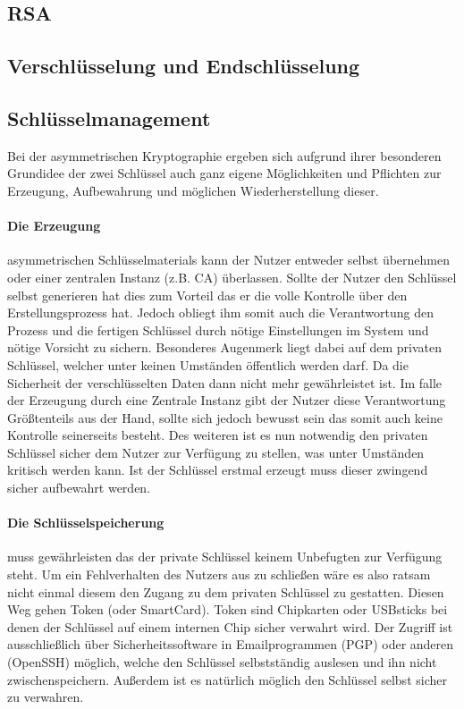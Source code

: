 \documentclass[paper=a4,11pt,german]{scrartcl} %
\begin{document}
\subsection{RSA}

\subsection{Verschlüsselung und Endschlüsselung}

\subsection{Schlüsselmanagement}
Bei der asymmetrischen Kryptographie ergeben sich aufgrund ihrer besonderen Grundidee der zwei Schlüssel auch ganz eigene Möglichkeiten und Pflichten zur Erzeugung, Aufbewahrung und möglichen Wiederherstellung dieser. 

\paragraph{Die Erzeugung}
asymmetrischen Schlüsselmaterials kann der Nutzer entweder selbst übernehmen oder einer zentralen Instanz (z.B. CA) überlassen.
Sollte der Nutzer den Schlüssel selbst generieren hat dies zum Vorteil das er die volle Kontrolle über den Erstellungsprozess hat. Jedoch obliegt ihm somit auch die Verantwortung den Prozess und die fertigen Schlüssel durch nötige Einstellungen im System und nötige Vorsicht zu sichern. Besonderes Augenmerk liegt dabei auf dem privaten Schlüssel, welcher unter keinen Umständen öffentlich werden darf. Da die Sicherheit der verschlüsselten Daten dann nicht mehr gewährleistet ist. 
Im falle der Erzeugung durch eine Zentrale Instanz gibt der Nutzer diese Verantwortung Größtenteils aus der Hand, sollte sich jedoch bewusst sein das somit auch keine Kontrolle seinerseits besteht. Des weiteren ist es nun notwendig den privaten Schlüssel sicher dem Nutzer zur Verfügung zu stellen, was unter Umständen kritisch werden kann. Ist der Schlüssel erstmal erzeugt muss dieser zwingend sicher aufbewahrt werden.

\paragraph{Die Schlüsselspeicherung}
muss gewährleisten das der private Schlüssel keinem Unbefugten zur Verfügung steht. Um ein Fehlverhalten des Nutzers aus zu schließen wäre es also ratsam nicht einmal diesem den Zugang zu dem privaten Schlüssel zu gestatten. Diesen Weg gehen Token (oder SmartCard). Token sind Chipkarten oder USBsticks bei denen der Schlüssel auf einem internen Chip sicher verwahrt wird. Der Zugriff ist ausschließlich über Sicherheitssoftware in Emailprogrammen (PGP) oder anderen (OpenSSH) möglich, welche den Schlüssel selbstständig auslesen und ihn nicht zwischenspeichern. Außerdem ist es natürlich möglich den Schlüssel selbst sicher zu verwahren.
\end{document}
